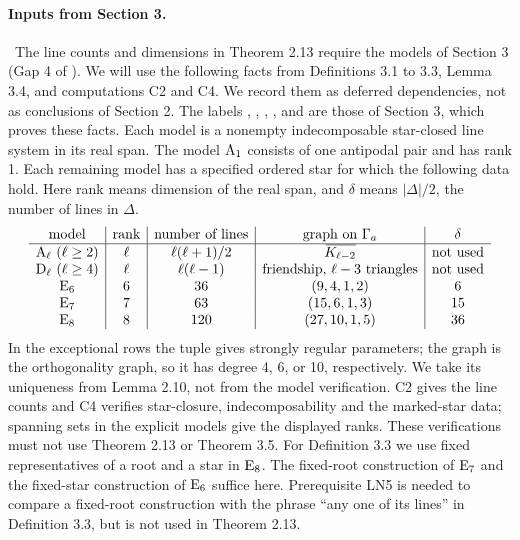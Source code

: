 \paragraph{Inputs from Section 3.}\label{input:sec3-models}
\repair\ The line counts and dimensions in Theorem 2.13 require the models of Section 3 (Gap 4 of ).
We will use the following facts from Definitions 3.1 to 3.3, Lemma 3.4, and computations C2
and C4. We record them as deferred dependencies, not as conclusions of Section 2.
The labels , , , ,
 and  are those of Section 3, which proves these facts.
Each model is a nonempty indecomposable star-closed line system in its real span. The model
$\mathrm{A}_1$ consists of one antipodal pair and has rank 1. Each remaining model has a specified
ordered star for which the following data hold. Here rank means dimension of the real span,
and $\delta$ means $|\Delta|/2$, the number of lines in $\Delta$.
\[
\begin{array}{c|c|c|c|c}
 \text{model}&\text{rank}&\text{number of lines}&\text{graph on }\Ga&\delta\\\hline
 \typ{A}_\ell\ (\ell\geq2)&\ell&\ell(\ell+1)/2&\comp{K_{\ell-2}}&\text{not used}\\
 \typ{D}_\ell\ (\ell\geq4)&\ell&\ell(\ell-1)&\text{friendship, }\ell-3\text{ triangles}&\text{not used}\\
 \typ{E}_6&6&36&(9,4,1,2)&6\\
 \typ{E}_7&7&63&(15,6,1,3)&15\\
 \typ{E}_8&8&120&(27,10,1,5)&36
\end{array}
\]
In the exceptional rows the tuple gives strongly regular parameters; the graph is the
orthogonality graph, so it has degree 4, 6, or 10, respectively. We take its uniqueness from
Lemma 2.10, not from the model verification. C2 gives the line counts and C4 verifies
star-closure, indecomposability and the marked-star data; spanning sets in the explicit
models give the displayed ranks. These verifications must not use Theorem 2.13 or Theorem 3.5.
For Definition 3.3 we use fixed representatives of a root and a star in $\mathrm{E}_8$.
The fixed-root construction of $\mathrm{E}_7$ and the fixed-star construction of $\mathrm{E}_6$
suffice here. Prerequisite LN5 is needed to compare a fixed-root construction with the
phrase ``any one of its lines'' in Definition 3.3, but is not used in Theorem 2.13.

